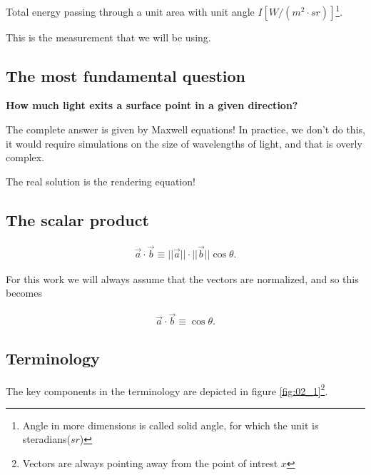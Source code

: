 \documentclass[../pbr.tex]{subfile}
\begin{document}
\begin{definition}[Radiance]
  Total energy passing through a unit area with unit angle
  $I\left[W/\left(m^2\cdot sr\right)\right]$\footnote{Angle in more dimensions
    is called solid angle, for which the unit is steradians($sr$)}.
\end{definition}

This is the measurement that we will be using.

\subsection{The most fundamental question}%
\label{sub:the_most_fundamental_question}

\textbf{How much light exits a surface point in a given direction?}

The complete answer is given by Maxwell equations! In practice, we don't do
this, it would require simulations on the size of wavelengths of light, and
that is overly complex.

The real solution is the rendering equation!

\subsection{The scalar product}%
\label{sub:the_scalar_product}

\begin{align*}
  \vec{a}\cdot\vec{b}\equiv||\vec{a}||\cdot||\vec{b}||\cos\theta.
\end{align*}

For this work we will always assume that the vectors are normalized, and so
this becomes

\begin{align*}
  \vec{a}\cdot\vec{b}\equiv\cos\theta.
\end{align*}

\subsection{Terminology}%
\label{sub:terminology}

The key components in the terminology are depicted in figure
\ref{fig:02_1}\footnote{Vectors are always pointing away from the point of
  intrest $x$}.

\begin{Figure}
  \begin{center}
    
  \end{center}
  \label{fig:02_1}
\end{Figure}
\end{document}
